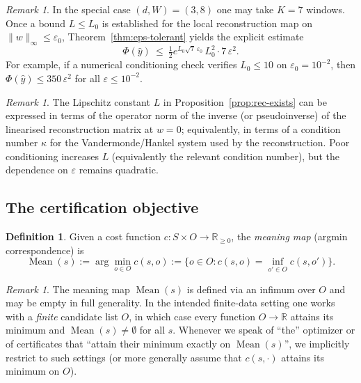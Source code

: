 \documentclass[11pt,reqno]{amsart}
\theoremstyle{definition}
\newtheorem{definition}[theorem]{Definition}
\theoremstyle{remark}
\newtheorem{remark}[theorem]{Remark} %
\newcommand{\R}{\mathbb{R}}
\newcommand{\1}{\mathbf{1}}
\newcommand{\Mean}{\operatorname{Mean}}
\begin{document}
\begin{remark}\label{rem:eps-numeric}
In the special case $(d,W)=(3,8)$ one may take $K=7$ windows.
Once a bound $L\le L_0$ is established for the local reconstruction map on $\|w\|_\infty\le \varepsilon_0$,
Theorem~\ref{thm:eps-tolerant} yields the explicit estimate
\[
\Phi(\hat y)\ \le\ \tfrac12 e^{L_0\sqrt{7}\,\varepsilon_0}\,L_0^2\cdot 7\,\varepsilon^2.
\]
For example, if a numerical conditioning check verifies $L_0\le 10$ on $\varepsilon_0=10^{-2}$,
then $\Phi(\hat y)\le 350\,\varepsilon^2$ for all $\varepsilon\le 10^{-2}$.
\end{remark}





\begin{remark}\label{rem:conditioning}
The Lipschitz constant $L$ in Proposition~\ref{prop:rec-exists} can be expressed in terms of the operator norm of
the inverse (or pseudoinverse) of the linearised reconstruction matrix at $w=0$; equivalently, in
terms of a condition number $\kappa$ for the Vandermonde/Hankel system used by the reconstruction.
Poor conditioning increases $L$ (equivalently the relevant condition number), but the dependence on $\varepsilon$ remains quadratic.
\end{remark}

\subsection{The certification objective}

\begin{definition}\label{def:meaning}
Given a cost function $c:S\times O\to\R_{\ge 0}$, the \emph{meaning map} (argmin correspondence) is
\[\Mean(s):=\arg\min_{o\in O} c(s,o):=\{o\in O: c(s,o)=\inf_{o'\in O}c(s,o')\}.\]
\end{definition}

\begin{remark}\label{rem:attainment}
The meaning map $\Mean(s)$ is defined via an infimum over $O$ and may be empty in full generality.
In the intended finite-data setting one works with a \emph{finite} candidate list $O$, in which case
every function $O\to\R$ attains its minimum and $\Mean(s)\neq\emptyset$ for all $s$.
Whenever we speak of ``the'' optimizer or of certificates that ``attain their minimum exactly on $\Mean(s)$'',
we implicitly restrict to such settings (or more generally assume that $c(s,\cdot)$ attains its minimum on $O$).
\end{remark}
\end{document}

